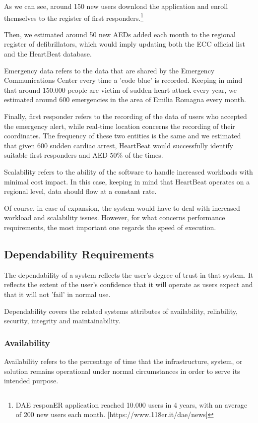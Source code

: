 \documentclass[11pt,a4paper]{article}
\begin{document}
As we can see, around 150 new users download the application and enroll themselves to the register of first responders.\footnote{DAE responER application reached 10.000 users  in 4 years, with an average of 200 new users each month. [https://www.118er.it/dae/news]}

Then, we estimated around 50 new AEDs added each month to the regional register of defibrillators, which would imply updating both the ECC official list and the HeartBeat database.

Emergency data refers to the data that are shared by the Emergency Communications Center every time a 'code blue' is recorded.
%
Keeping in mind that around 150.000 people are victim of sudden heart attack every year, we estimated around 600 emergencies in the area of Emilia Romagna every month.

Finally, first responder refers to the recording of the data of users who accepted the emergency alert, while real-time location concerns the recording of their coordinates.
%
The frequency of these two entities is the same and we estimated that given 600 sudden cardiac arrest, HeartBeat would successfully identify suitable first responders and AED 50\% of the times.

Scalability refers to the ability of the software to handle increased workloads with minimal cost impact.
%
In this case, keeping in mind that HeartBeat operates on a regional level, data should flow at a constant rate.

Of course, in case of expansion, the system would have to deal with increased workload and scalability issues.
%
However, for what concerns performance requirements, the most important one regards the speed of execution.

\subsection{Dependability Requirements}
The dependability of a system reflects the user's degree of trust in that system. 
%
It reflects the extent of the user's confidence that it will operate as users expect and that it will not 'fail' in normal use. 

Dependability covers the related systems attributes of availability, reliability, security, integrity and maintainability.

\subsubsection{Availability}
Availability refers to the percentage of time that the infrastructure, system, or solution remains operational under normal circumstances in order to serve its intended purpose. 
\end{document}
